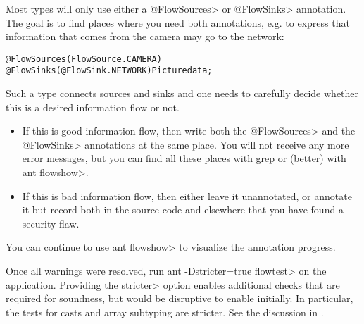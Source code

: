 Most types will only use either a \<@FlowSources> or \<@FlowSinks>
annotation.
The goal is to find places where you need both annotations, e.g. to
express that information that comes from the camera may go to the
network:

\begin{alltt}
    @FlowSources(FlowSource.CAMERA)
    @FlowSinks(@FlowSink.NETWORK) Picture data;
\end{alltt}

Such a type connects sources and sinks and one needs to carefully
decide whether this is a desired information flow or not.
\begin{itemize}
\item If this is good information flow, then write both the \<@FlowSources>
  and the \<@FlowSinks> annotations at the same place. You will not
  receive any more error messages, but you can find all these places
  with grep or (better) with \<ant flowshow>.
\item If this is bad information flow, then either leave it unannotated,
  or annotate it but record both in the source code and elsewhere that
  you have found a security flaw.
\end{itemize}

You can continue to use \<ant flowshow> to visualize the annotation
progress.

Once all warnings were resolved, run \<ant -Dstricter=true flowtest> on
the application.
Providing the \<stricter> option enables additional checks that are
required for soundness, but would be disruptive to enable initially.
In particular, the tests for casts and array subtyping are stricter.
See the discussion in .




